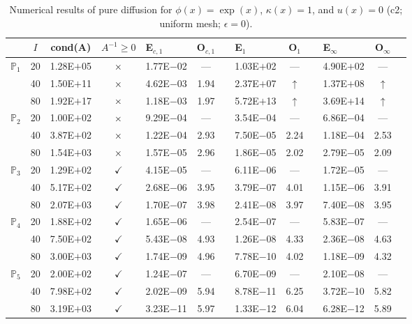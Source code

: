 \begin{table}[H]
\centering
\caption{Numerical results of pure diffusion for $\phi(x)=\exp(x)$, $\kappa(x)=1$, and $u(x)=0$ (c2; uniform mesh; $\epsilon=0$).}
\begin{tabular}{@{}l c c c l c c l c c l c c@{}}
\toprule
 & $I$ & cond(A) & $A^{-1}\geq 0$ &  E$_{c,1}$ & O$_{c,1}$ && E$_1$ & O$_1$ && E$_{\infty}$ & O$_{\infty}$\\
\midrule
\multirow{3}{*}{$\mathbb{P}_{1}$}
 & 20 & 1.28E$+$05 & $\times$ & 1.77E$-$02 & --- && 1.03E$+$02 & --- && 4.90E$+$02 & ---\\
 & 40 & 1.50E$+$11 & $\times$ & 4.62E$-$03 & 1.94 && 2.37E$+$07 & $\uparrow$ && 1.37E$+$08 & $\uparrow$\\
 & 80 & 1.92E$+$17 & $\times$ & 1.18E$-$03 & 1.97 && 5.72E$+$13 & $\uparrow$ && 3.69E$+$14 & $\uparrow$\\
\midrule
\multirow{3}{*}{$\mathbb{P}_{2}$}
 & 20 & 1.00E$+$02 & $\times$ & 9.29E$-$04 & --- && 3.54E$-$04 & --- && 6.86E$-$04 & ---\\
 & 40 & 3.87E$+$02 & $\times$ & 1.22E$-$04 & 2.93 && 7.50E$-$05 & 2.24 && 1.18E$-$04 & 2.53\\
 & 80 & 1.54E$+$03 & $\times$ & 1.57E$-$05 & 2.96 && 1.86E$-$05 & 2.02 && 2.79E$-$05 & 2.09\\
\midrule
\multirow{3}{*}{$\mathbb{P}_{3}$}
 & 20 & 1.29E$+$02 & $\checkmark$ & 4.15E$-$05 & --- && 6.11E$-$06 & --- && 1.72E$-$05 & ---\\
 & 40 & 5.17E$+$02 & $\checkmark$ & 2.68E$-$06 & 3.95 && 3.79E$-$07 & 4.01 && 1.15E$-$06 & 3.91\\
 & 80 & 2.07E$+$03 & $\checkmark$ & 1.70E$-$07 & 3.98 && 2.41E$-$08 & 3.97 && 7.40E$-$08 & 3.95\\
\midrule
\multirow{3}{*}{$\mathbb{P}_{4}$}
 & 20 & 1.88E$+$02 & $\checkmark$ & 1.65E$-$06 & --- && 2.54E$-$07 & --- && 5.83E$-$07 & ---\\
 & 40 & 7.50E$+$02 & $\checkmark$ & 5.43E$-$08 & 4.93 && 1.26E$-$08 & 4.33 && 2.36E$-$08 & 4.63\\
 & 80 & 3.00E$+$03 & $\checkmark$ & 1.74E$-$09 & 4.96 && 7.78E$-$10 & 4.02 && 1.18E$-$09 & 4.32\\
\midrule
\multirow{3}{*}{$\mathbb{P}_{5}$}
 & 20 & 2.00E$+$02 & $\checkmark$ & 1.24E$-$07 & --- && 6.70E$-$09 & --- && 2.10E$-$08 & ---\\
 & 40 & 7.98E$+$02 & $\checkmark$ & 2.02E$-$09 & 5.94 && 8.78E$-$11 & 6.25 && 3.72E$-$10 & 5.82\\
 & 80 & 3.19E$+$03 & $\checkmark$ & 3.23E$-$11 & 5.97 && 1.33E$-$12 & 6.04 && 6.28E$-$12 & 5.89\\
\bottomrule
\end{tabular}
\end{table}
